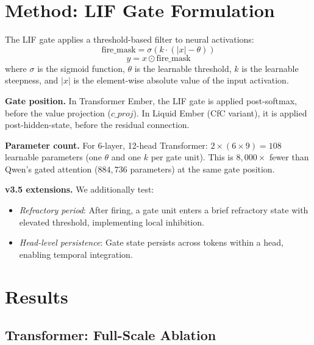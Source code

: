 \documentclass[11pt]{article}
\begin{document}
\section{Method: LIF Gate Formulation}

The LIF gate applies a threshold-based filter to neural activations:
\begin{equation}
    \text{fire\_mask} = \sigma(k \cdot (|x| - \theta))
\end{equation}
\begin{equation}
    y = x \odot \text{fire\_mask}
\end{equation}
where $\sigma$ is the sigmoid function, $\theta$ is the learnable threshold, $k$ is the learnable steepness, and $|x|$ is the element-wise absolute value of the input activation.

\textbf{Gate position.} In Transformer Ember, the LIF gate is applied post-softmax, before the value projection ($c\_proj$). In Liquid Ember (CfC variant), it is applied post-hidden-state, before the residual connection.

\textbf{Parameter count.} For 6-layer, 12-head Transformer: $2 \times (6 \times 9) = 108$ learnable parameters (one $\theta$ and one $k$ per gate unit). This is $8{,}000\times$ fewer than Qwen's gated attention \citep{yang2025qwen3} ($884{,}736$ parameters) at the same gate position.

\textbf{v3.5 extensions.} We additionally test:
\begin{itemize}
    \item \emph{Refractory period}: After firing, a gate unit enters a brief refractory state with elevated threshold, implementing local inhibition.
    \item \emph{Head-level persistence}: Gate state persists across tokens within a head, enabling temporal integration.
\end{itemize}


\section{Results}

\subsection{Transformer: Full-Scale Ablation}
\label{sec:transformer-full}
\end{document}
